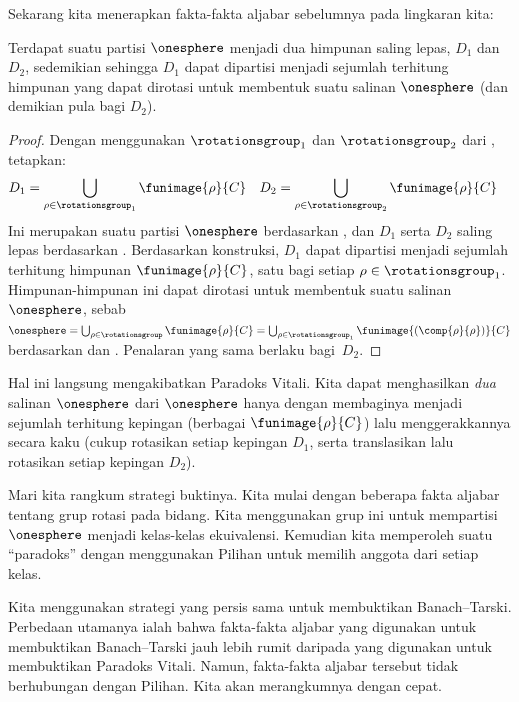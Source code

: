 \documentclass[../../../include/open-logic-section]{subfiles}
\begin{document}
Sekarang kita menerapkan fakta-fakta aljabar sebelumnya pada lingkaran kita:

\begin{lem}
Terdapat suatu partisi $\onesphere$ menjadi dua himpunan saling lepas,
$D_{1}$ dan $D_{2}$, sedemikian sehingga $D_{1}$ dapat dipartisi menjadi
sejumlah terhitung himpunan yang dapat dirotasi untuk membentuk suatu salinan
$\onesphere$ (dan demikian pula bagi $D_{2}$).
\end{lem}

\begin{proof}
Dengan menggunakan $\rotationsgroup_{1}$ dan $\rotationsgroup_{2}$ dari
, tetapkan:
\begin{align*}
	D_{1} &= \bigcup_{\rho \in \rotationsgroup_1} \funimage{\rho}{C} &
	D_{2} &= \bigcup_{\rho \in \rotationsgroup_2} \funimage{\rho}{C}
\end{align*}
Ini merupakan suatu partisi $\onesphere$ berdasarkan
, dan $D_1$ serta $D_2$ saling lepas berdasarkan
. Berdasarkan konstruksi, $D_1$ dapat dipartisi
menjadi sejumlah terhitung himpunan $\funimage{\rho}{C}$, satu bagi setiap
$\rho\in\rotationsgroup_1$. Himpunan-himpunan ini dapat dirotasi untuk
membentuk suatu salinan $\onesphere$, sebab
$\onesphere=\bigcup_{\rho\in\rotationsgroup}\funimage{\rho}{C}
=\bigcup_{\rho\in\rotationsgroup_1}
\funimage{(\comp{\rho}{\rho})}{C}$ berdasarkan  dan
. Penalaran yang sama berlaku bagi~$D_2$.
\end{proof}
\noindent
Hal ini langsung mengakibatkan Paradoks Vitali. Kita dapat menghasilkan
\emph{dua} salinan $\onesphere$ dari $\onesphere$ hanya dengan membaginya
menjadi sejumlah terhitung kepingan (berbagai
$\funimage{\rho}{C}$) lalu menggerakkannya secara kaku (cukup rotasikan
setiap kepingan $D_1$, serta translasikan lalu rotasikan setiap kepingan
$D_2$).

Mari kita rangkum strategi buktinya. Kita mulai dengan beberapa fakta aljabar
tentang grup rotasi pada bidang. Kita menggunakan grup ini untuk mempartisi
$\onesphere$ menjadi kelas-kelas ekuivalensi. Kemudian kita memperoleh suatu
``paradoks'' dengan menggunakan Pilihan untuk memilih anggota dari setiap
kelas.

Kita menggunakan strategi yang persis sama untuk membuktikan Banach--Tarski.
Perbedaan utamanya ialah bahwa fakta-fakta aljabar yang digunakan untuk
membuktikan Banach--Tarski jauh lebih rumit daripada yang digunakan untuk
membuktikan Paradoks Vitali. Namun, fakta-fakta aljabar tersebut tidak
berhubungan dengan Pilihan. Kita akan merangkumnya dengan cepat.
\end{document}
